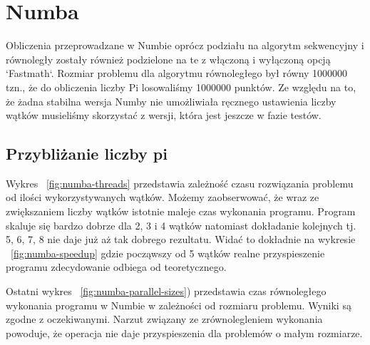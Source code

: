 \section{Numba}
Obliczenia przeprowadzane w Numbie oprócz podziału na algorytm sekwencyjny i równoległy
zostały również podzielone na te z włączoną i wyłączoną  opcją `Fastmath`.
Rozmiar problemu dla algorytmu równoległego był równy 1000000 tzn., że do obliczenia
liczby Pi losowaliśmy 1000000 punktów.
Ze względu na to, że żadna stabilna wersja Numby nie umożliwiała ręcznego ustawienia
liczby wątków musieliśmy skorzystać z wersji, która jest jeszcze w fazie testów.


\subsection{Przybliżanie liczby pi}

\begin{figure*}
    \centering
    \begin{minipage}[b]{.45\textwidth}
        \centering
        
        \caption{Przyspieszenie liczenia liczby $\pi$ w Numbie}
        \label{fig:numba-speedup}
    \end{minipage}
    \hfill
    \begin{minipage}[b]{.45\textwidth}
        \centering
        
        \caption{Czas wykonania algorytmu w Numbie w zależności od liczby wątków}
        \label{fig:numba-threads}
    \end{minipage}
\end{figure*}

\begin{figure*}
    \centering
    
    \caption{Czas równoległego wykonania algorytmu w Numbie w zależności od rozmiaru problemu}
    \label{fig:numba-parallel-sizes}
\end{figure*}

Wykres ~\ref{fig:numba-threads} przedstawia zależność czasu rozwiązania problemu
od ilości wykorzystywanych
wątków.
Możemy zaobserwować, że wraz ze zwiększaniem liczby wątków istotnie maleje czas
wykonania programu.
Program skaluje się bardzo dobrze dla 2, 3 i 4 wątków natomiast
dokładanie kolejnych tj. 5, 6, 7, 8 nie daje już aż tak dobrego rezultatu.
Widać to dokładnie
na wykresie ~\ref{fig:numba-speedup} gdzie począwszy od 5 wątków realne przyspieszenie
programu zdecydowanie odbiega od teoretycznego.

Ostatni wykres ~\ref{fig:numba-parallel-sizes}) przedstawia czas równoległego wykonania
programu w Numbie w zależności od rozmiaru problemu. Wyniki są zgodne z oczekiwanymi.
Narzut związany ze zrównolegleniem wykonania powoduje, że operacja nie daje przyspieszenia
dla problemów o małym rozmiarze.

